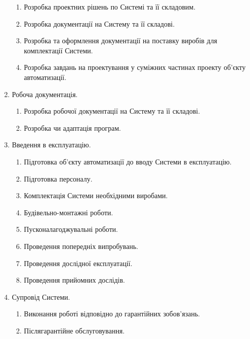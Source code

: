 \documentclass[
	a4paper,
	oneside,
	BCOR = 10mm,
	DIV = 12,
	12pt,
	headings = normal,
]{scrartcl}
\begin{document}
\begin{enumerate}[noitemsep]
\begin{enumerate}[noitemsep, topsep = 0\baselineskip]
					\item Розробка проектних рішень по Системі та її складовим.
					\item Розробка документації на Систему та її складові.
					\item Розробка та оформлення документації на поставку виробів для комплектації Системи.
					\item Розробка завдань на проектування у суміжних частинах проекту об'єкту автоматизації.
				\end{enumerate}
			\item Робоча документація.
				\begin{enumerate}[noitemsep, topsep = 0\baselineskip]
					\item Розробка робочої документації на Систему та її складові.
					\item Розробка чи адаптація програм.
				\end{enumerate}
			\item Введення в експлуатацію.
				\begin{enumerate}[noitemsep, topsep = 0\baselineskip]
					\item Підготовка об'єкту автоматизації до вводу Системи в експлуатацію.
					\item Підготовка персоналу.
					\item Комплектація Системи необхідними виробами.
					\item Будівельно-монтажні роботи.
					\item Пусконалагоджувальні роботи.
					\item Проведення попередніх випробувань.
					\item Проведення дослідної експлуатації.
					\item Проведення прийомних дослідів.
				\end{enumerate}
			\item Супровід Системи.
				\begin{enumerate}[noitemsep, topsep = 0\baselineskip]
					\item Виконання роботі відповідно до гарантійних зобов'язань.
					\item Післягарантійне обслуговування.
				\end{enumerate}
		\end{enumerate}
\end{document}
